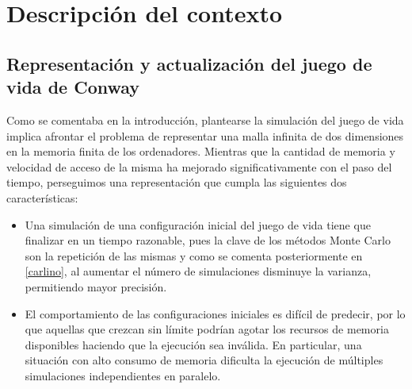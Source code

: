 \documentclass[../proyecto.tex]{memoir}
\begin{document}
\chapter{Descripción del contexto}


\section{Representación y actualización del juego de vida de Conway}


Como se comentaba en la introducción, plantearse la simulación del juego de vida implica afrontar el problema de representar una malla infinita de dos dimensiones en la memoria finita de los ordenadores. Mientras que la cantidad de memoria y velocidad de acceso de la misma ha mejorado significativamente con el paso del tiempo, perseguimos una representación que cumpla las siguientes dos características:

\begin{itemize}
\item Una simulación de una configuración inicial del juego de vida tiene que finalizar en un tiempo razonable, pues la clave de los métodos Monte Carlo son la repetición de las mismas y como se comenta posteriormente en \ref{carlino}, al aumentar el número de simulaciones disminuye la varianza, permitiendo mayor precisión.

\item El comportamiento de las configuraciones iniciales es difícil de predecir, por lo que aquellas que crezcan sin límite podrían agotar los recursos de memoria disponibles haciendo que la ejecución sea inválida. En particular, una situación con alto consumo de memoria dificulta la ejecución de múltiples simulaciones independientes en paralelo.
\end{itemize}
\end{document}
